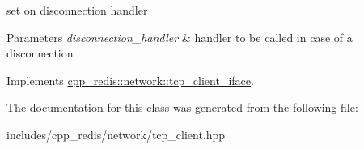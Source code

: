 set on disconnection handler


\begin{DoxyParams}{Parameters}
{\em disconnection\+\_\+handler} & handler to be called in case of a disconnection \\
\hline
\end{DoxyParams}


Implements \hyperlink{classcpp__redis_1_1network_1_1tcp__client__iface_acecf3b75c3849071d82478bc7a8c97a8}{cpp\+\_\+redis\+::network\+::tcp\+\_\+client\+\_\+iface}.



The documentation for this class was generated from the following file\+:\begin{DoxyCompactItemize}
\item 
includes/cpp\+\_\+redis/network/tcp\+\_\+client.\+hpp\end{DoxyCompactItemize}
